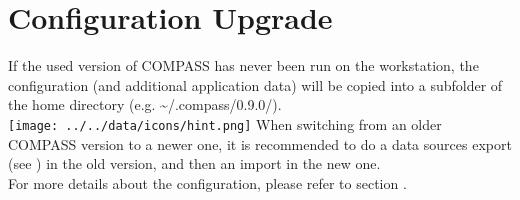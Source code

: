 
\section{Configuration Upgrade}

If the used version of COMPASS has never been run on the workstation, the configuration (and additional application data) will be copied into a subfolder of the home directory (e.g. \textasciitilde/.compass/0.9.0/). \\

\texttt{[image: ../../data/icons/hint.png]} When switching from an older COMPASS version to a newer one, it is recommended to do a data sources export (see ) in the old version, 
and then an import in the new one. \\

For more details about the configuration, please refer to section .
